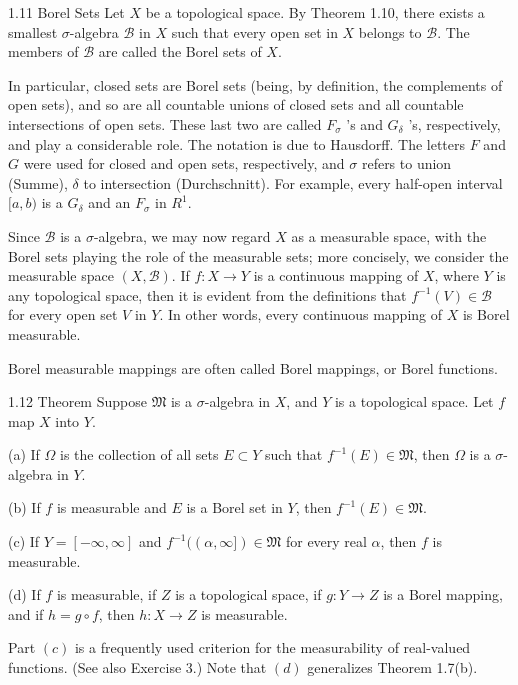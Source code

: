 \documentclass[10pt]{article}
\begin{document}
1.11 Borel Sets Let $X$ be a topological space. By Theorem 1.10, there exists a smallest $\sigma$-algebra $\mathscr{B}$ in $X$ such that every open set in $X$ belongs to $\mathscr{B}$. The members of $\mathscr{B}$ are called the Borel sets of $X$.

In particular, closed sets are Borel sets (being, by definition, the complements of open sets), and so are all countable unions of closed sets and all countable intersections of open sets. These last two are called $F_{\sigma}$ 's and $G_{\delta}$ 's, respectively, and play a considerable role. The notation is due to Hausdorff. The letters $F$ and $G$ were used for closed and open sets, respectively, and $\sigma$ refers to union (Summe), $\delta$ to intersection (Durchschnitt). For example, every half-open interval $[a, b)$ is a $G_{\delta}$ and an $F_{\sigma}$ in $R^{1}$.

Since $\mathscr{B}$ is a $\sigma$-algebra, we may now regard $X$ as a measurable space, with the Borel sets playing the role of the measurable sets; more concisely, we consider the measurable space $(X, \mathscr{B})$. If $f: X \rightarrow Y$ is a continuous mapping of $X$, where $Y$ is any topological space, then it is evident from the definitions that $f^{-1}(V) \in \mathscr{B}$ for every open set $V$ in $Y$. In other words, every continuous mapping of $X$ is Borel measurable.

Borel measurable mappings are often called Borel mappings, or Borel functions.

1.12 Theorem Suppose $\mathfrak{M}$ is a $\sigma$-algebra in $X$, and $Y$ is a topological space. Let $f$ map $X$ into $Y$.

(a) If $\Omega$ is the collection of all sets $E \subset Y$ such that $f^{-1}(E) \in \mathfrak{M}$, then $\Omega$ is a $\sigma$-algebra in $Y$.

(b) If $f$ is measurable and $E$ is a Borel set in $Y$, then $f^{-1}(E) \in \mathfrak{M}$.

(c) If $Y=[-\infty, \infty]$ and $f^{-1}((\alpha, \infty]) \in \mathfrak{M}$ for every real $\alpha$, then $f$ is measurable.

(d) If $f$ is measurable, if $Z$ is a topological space, if $g: Y \rightarrow Z$ is a Borel mapping, and if $h=g \circ f$, then $h: X \rightarrow Z$ is measurable.

Part $(c)$ is a frequently used criterion for the measurability of real-valued functions. (See also Exercise 3.) Note that $(d)$ generalizes Theorem 1.7(b).
\end{document}
